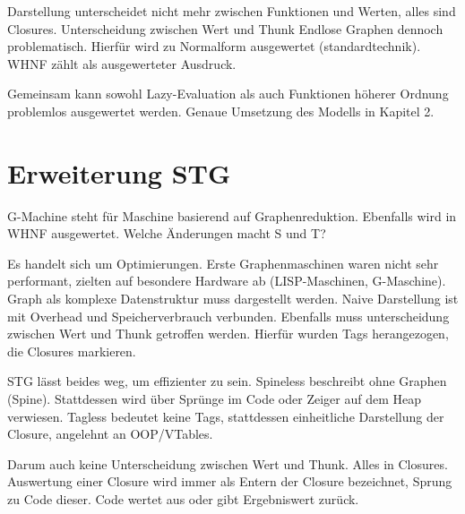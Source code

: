 
Darstellung unterscheidet nicht mehr zwischen Funktionen und Werten, alles sind Closures.
Unterscheidung zwischen Wert und Thunk 
Endlose Graphen dennoch problematisch.
Hierfür wird zu Normalform ausgewertet (standardtechnik).
WHNF zählt als ausgewerteter Ausdruck.


Gemeinsam kann sowohl Lazy-Evaluation als auch Funktionen höherer Ordnung problemlos ausgewertet werden.
Genaue Umsetzung des Modells in Kapitel 2.


\section{Erweiterung STG}

G-Machine steht für Maschine basierend auf Graphenreduktion.
Ebenfalls wird in WHNF ausgewertet.
Welche Änderungen macht S und T?

Es handelt sich um Optimierungen.
Erste Graphenmaschinen waren nicht sehr performant, zielten auf besondere Hardware ab (LISP-Maschinen, G-Maschine).
Graph als komplexe Datenstruktur muss dargestellt werden.
Naive Darstellung ist mit Overhead und Speicherverbrauch verbunden.
Ebenfalls muss unterscheidung zwischen Wert und Thunk getroffen werden.
Hierfür wurden Tags herangezogen, die Closures markieren.

STG lässt beides weg, um effizienter zu sein.
Spineless beschreibt ohne Graphen (Spine).
Stattdessen wird über Sprünge im Code oder Zeiger auf dem Heap verwiesen.
Tagless bedeutet keine Tags, stattdessen einheitliche Darstellung der Closure, angelehnt an OOP/VTables.


Darum auch keine Unterscheidung zwischen Wert und Thunk. Alles in Closures.
Auswertung einer Closure wird immer als Entern der Closure bezeichnet, Sprung zu Code dieser.
Code wertet aus oder gibt Ergebniswert zurück.




